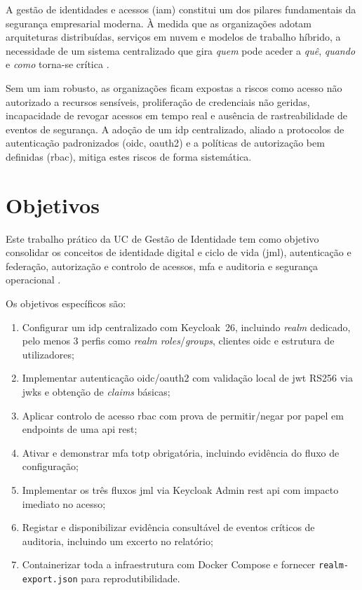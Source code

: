 A gestão de identidades e acessos (\gls{iam}) constitui um dos pilares fundamentais da segurança empresarial moderna. À medida que as organizações adotam arquiteturas distribuídas, serviços em nuvem e modelos de trabalho híbrido, a necessidade de um sistema centralizado que gira \textit{quem} pode aceder a \textit{quê}, \textit{quando} e \textit{como} torna-se crítica \cite{NIST80063B}.

Sem um \gls{iam} robusto, as organizações ficam expostas a riscos como acesso não autorizado a recursos sensíveis, proliferação de credenciais não geridas, incapacidade de revogar acessos em tempo real e ausência de rastreabilidade de eventos de segurança. A adoção de um \gls{idp} centralizado, aliado a protocolos de autenticação padronizados (\gls{oidc}, \gls{oauth2}) e a políticas de autorização bem definidas (\gls{rbac}), mitiga estes riscos de forma sistemática.

\section{Objetivos}

Este trabalho prático da UC de Gestão de Identidade tem como objetivo consolidar os conceitos de identidade digital e ciclo de vida (\gls{jml}), autenticação e federação, autorização e controlo de acessos, \gls{mfa} e auditoria e segurança operacional \cite{Costa2026}.

Os objetivos específicos são:

\begin{enumerate}
  \item Configurar um \gls{idp} centralizado com Keycloak~26, incluindo \textit{realm} dedicado, pelo menos 3 perfis como \textit{realm roles}/\textit{groups}, clientes \gls{oidc} e estrutura de utilizadores;
  \item Implementar autenticação \gls{oidc}/\gls{oauth2} com validação local de \gls{jwt} RS256 via \gls{jwks} e obtenção de \textit{claims} básicas;
  \item Aplicar controlo de acesso \gls{rbac} com prova de permitir/negar por papel em endpoints de uma \gls{api} \gls{rest};
  \item Ativar e demonstrar \gls{mfa} \gls{totp} obrigatória, incluindo evidência do fluxo de configuração;
  \item Implementar os três fluxos \gls{jml} via Keycloak Admin \gls{rest} \gls{api} com impacto imediato no acesso;
  \item Registar e disponibilizar evidência consultável de eventos críticos de auditoria, incluindo um excerto no relatório;
  \item Containerizar toda a infraestrutura com Docker Compose e fornecer \texttt{realm-export.json} para reprodutibilidade.
\end{enumerate}

